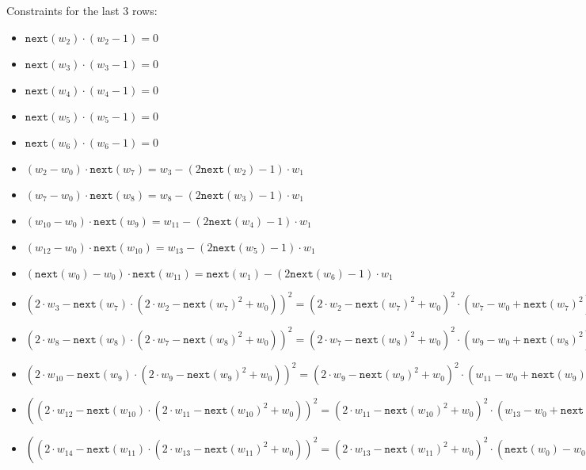 Constraints for the last $3$ rows:
\begin{itemize}
     \item $\texttt{next}(w_2) \cdot (w_2 - 1) = 0$
    \item $\texttt{next}(w_3) \cdot (w_3 - 1) = 0$
    \item $\texttt{next}(w_4) \cdot (w_4 - 1) = 0$
    \item $\texttt{next}(w_5) \cdot (w_5 - 1) = 0$
    \item $\texttt{next}(w_6) \cdot (w_6 - 1) = 0$ \\

    \item $(w_{2} - w_{0}) \cdot \texttt{next}(w_7) = w_3 - (2\texttt{next}(w_{2}) - 1) \cdot w_1$
    \item $(w_{7} - w_{0}) \cdot \texttt{next}(w_8) = w_8 - (2\texttt{next}(w_{3}) - 1) \cdot w_1$
    \item $(w_{10} - w_{0}) \cdot \texttt{next}(w_9) = w_{11} - (2\texttt{next}(w_{4}) - 1) \cdot w_1$
    \item $(w_{12} - w_{0}) \cdot \texttt{next}(w_{10}) = w_{13} - (2\texttt{next}(w_{5}) - 1) \cdot w_1$
    \item $(\texttt{next}(w_{0}) - w_{0}) \cdot \texttt{next}(w_{11}) = \texttt{next}(w_1) - (2\texttt{next}(w_{6}) - 1) \cdot w_1$ \\
    
    
    \item $(2\cdot w_{3} - \texttt{next}(w_7) \cdot (2 \cdot w_2 - \texttt{next}(w_7)^2 + w_{0}))^2 =  (2 \cdot w_2 - \texttt{next}(w_7)^2 + w_{0})^2 \cdot (w_7 - w_0 + \texttt{next}(w_7)^2)$
    \item $(2\cdot w_{8} - \texttt{next}(w_8) \cdot (2 \cdot w_7 - \texttt{next}(w_8)^2 + w_{0}))^2 =  (2 \cdot w_7 - \texttt{next}(w_8)^2 + w_{0})^2 \cdot (w_9 - w_0 + \texttt{next}(w_8)^2)$
    \item $(2\cdot w_{10} - \texttt{next}(w_9) \cdot (2 \cdot w_9 - \texttt{next}(w_9)^2 + w_{0}))^2 =  (2 \cdot w_9 - \texttt{next}(w_9)^2 + w_{0})^2 \cdot (w_{11} - w_0 + \texttt{next}(w_9)^2)$
    \item $((2\cdot w_{12} - \texttt{next}(w_{10}) \cdot (2 \cdot w_{11} - \texttt{next}(w_{10})^2 + w_{0}))^2 =  (2 \cdot w_{11} - \texttt{next}(w_{10})^2 + w_{0})^2 \cdot (w_{13} - w_0 + \texttt{next}(w_{10})^2)) \cdot (\texttt{next + 1}(w_8)\cdot \texttt{next + 1}(w_2))$
    \item $((2\cdot w_{14} - \texttt{next}(w_{11}) \cdot (2 \cdot w_{13} - \texttt{next}(w_{11})^2 + w_{0}))^2 =  (2 \cdot w_{13} - \texttt{next}(w_{11})^2 + w_{0})^2 \cdot (\texttt{next}(w_0) - w_0 + \texttt{next}(w_{11})^2))\cdot (\texttt{next + 1}(w_8)\cdot \texttt{next + 1}(w_2))$\\
    

\end{itemize}
